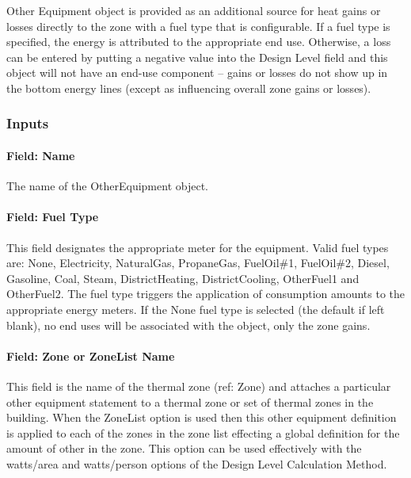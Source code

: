 Other Equipment object is provided as an additional source for heat gains or losses directly to the zone with a fuel type that is configurable. If a fuel type is specified, the energy is attributed to the appropriate end use. Otherwise, a loss can be entered by putting a negative value into the Design Level field and this object will not have an end-use component -- gains or losses do not show up in the bottom energy lines (except as influencing overall zone gains or losses).

\subsubsection{Inputs}\label{inputs-8-010}

\paragraph{Field: Name}\label{field-name-8-008}

The name of the OtherEquipment object.

\paragraph{Field: Fuel Type}\label{field-fuel-use-type}

This field designates the appropriate meter for the equipment. Valid fuel types are: None, Electricity, NaturalGas, PropaneGas, FuelOil\#1, FuelOil\#2, Diesel, Gasoline, Coal, Steam, DistrictHeating, DistrictCooling, OtherFuel1 and OtherFuel2. The fuel type triggers the application of consumption amounts to the appropriate energy meters. If the None fuel type is selected (the default if left blank), no end uses will be associated with the object, only the zone gains. 

\paragraph{Field: Zone or ZoneList Name}\label{field-zone-or-zonelist-name-6}

This field is the name of the thermal zone (ref: Zone) and attaches a particular other equipment statement to a thermal zone or set of thermal zones in the building. When the ZoneList option is used then this other equipment definition is applied to each of the zones in the zone list effecting a global definition for the amount of other in the zone. This option can be used effectively with the watts/area and watts/person options of the Design Level Calculation Method.

